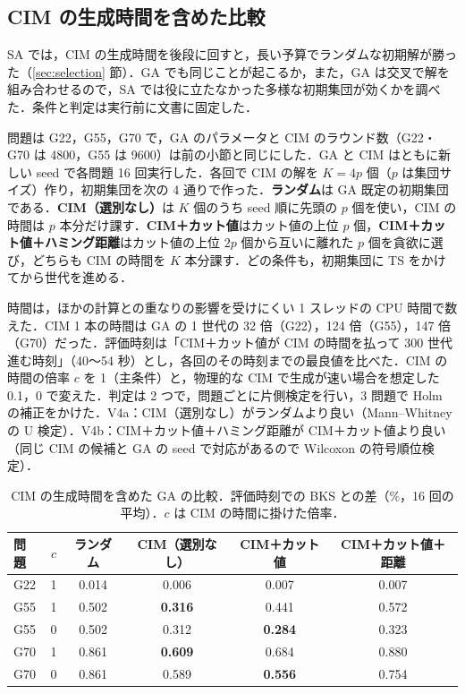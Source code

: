 \subsection{CIM の生成時間を含めた比較}\label{sec:ga_equal_time}

SA では，CIM の生成時間を後段に回すと，長い予算でランダムな初期解が勝った（\ref{sec:selection} 節）．GA でも同じことが起こるか，また，GA は交叉で解を組み合わせるので，SA では役に立たなかった多様な初期集団が効くかを調べた．条件と判定は実行前に文書に固定した．

問題は G22，G55，G70 で，GA のパラメータと CIM のラウンド数（G22・G70 は 4800，G55 は 9600）は前の小節と同じにした．GA と CIM はともに新しい seed で各問題 16 回実行した．各回で CIM の解を $K=4p$ 個（$p$ は集団サイズ）作り，初期集団を次の 4 通りで作った．\textbf{ランダム}は GA 既定の初期集団である．\textbf{CIM（選別なし）}は $K$ 個のうち seed 順に先頭の $p$ 個を使い，CIM の時間は $p$ 本分だけ課す．\textbf{CIM＋カット値}はカット値の上位 $p$ 個，\textbf{CIM＋カット値＋ハミング距離}はカット値の上位 $2p$ 個から互いに離れた $p$ 個を貪欲に選び，どちらも CIM の時間を $K$ 本分課す．どの条件も，初期集団に TS をかけてから世代を進める．

時間は，ほかの計算との重なりの影響を受けにくい 1 スレッドの CPU 時間で数えた．CIM 1 本の時間は GA の 1 世代の 32 倍（G22），124 倍（G55），147 倍（G70）だった．評価時刻は「CIM＋カット値が CIM の時間を払って 300 世代進む時刻」（40〜54 秒）とし，各回のその時刻までの最良値を比べた．CIM の時間の倍率 $c$ を 1（主条件）と，物理的な CIM で生成が速い場合を想定した 0.1，0 で変えた．判定は 2 つで，問題ごとに片側検定を行い，3 問題で Holm の補正をかけた．V4a：CIM（選別なし）がランダムより良い（Mann--Whitney の U 検定）．V4b：CIM＋カット値＋ハミング距離が CIM＋カット値より良い（同じ CIM の候補と GA の seed で対応があるので Wilcoxon の符号順位検定）．

\begin{table}[t]
\centering
\caption{CIM の生成時間を含めた GA の比較．評価時刻での BKS との差（\%，16 回の平均）．$c$ は CIM の時間に掛けた倍率．}\label{tab:ga_equal_time}
\small
\begin{tabular}{lccccc}
\toprule
問題 & $c$ & ランダム & CIM（選別なし） & CIM＋カット値 & CIM＋カット値＋距離 \\
\midrule
G22 & 1 & 0.014 & 0.006 & 0.007 & 0.007 \\
G55 & 1 & 0.502 & \textbf{0.316} & 0.441 & 0.572 \\
G55 & 0 & 0.502 & 0.312 & \textbf{0.284} & 0.323 \\
G70 & 1 & 0.861 & \textbf{0.609} & 0.684 & 0.880 \\
G70 & 0 & 0.861 & 0.589 & \textbf{0.556} & 0.754 \\
\bottomrule
\end{tabular}
\end{table}

